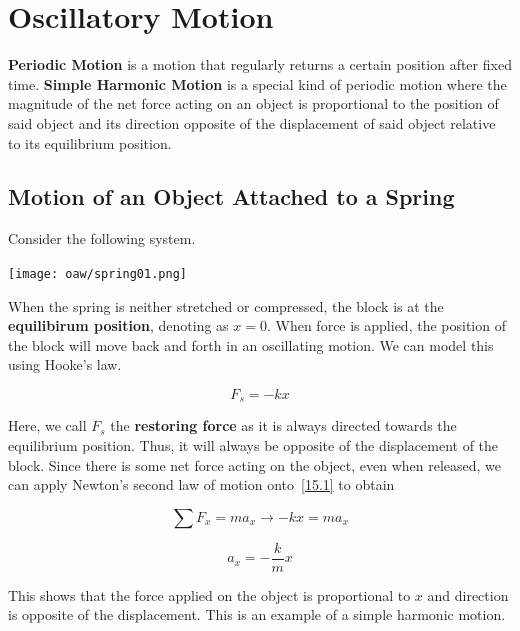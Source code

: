 \chapter{Oscillatory Motion}

\textbf{Periodic Motion} is a motion that regularly returns a certain position after fixed time.
\textbf{Simple Harmonic Motion} is a special kind of periodic motion where the magnitude of the 
net force acting on an object is proportional to the position of said object and its direction
opposite of the displacement of said object relative to its equilibrium position.

\section{Motion of an Object Attached to a Spring}

Consider the following system.

\begin{center}
\texttt{[image: oaw/spring01.png]}\label{fig15.1}
\end{center}

When the spring is neither stretched or compressed, the block is at the \textbf{equilibirum position},
denoting as $x = 0$. When force is applied, the position of the block will move back and forth in an 
oscillating motion. We can model this using Hooke's law.

\begin{equation}\label{15.1}
    F_s = -kx
\end{equation} 

Here, we call $F_s$ the \textbf{restoring force} as it is always directed towards the equilibrium position.
Thus, it will always be opposite of the displacement of the block. Since there is some net force
acting on the object, even when released, we can apply Newton's second law of motion onto~\eqref{15.1}
to obtain

\begin{equation*}
    \sum F_x = ma_x \rightarrow -kx = ma_x
\end{equation*}

\begin{equation}\label{15.2}
    a_x = - \frac{k}{m}x
\end{equation}

This shows that the force applied on the object is proportional to $x$ and direction is opposite 
of the displacement. This is an example of a simple harmonic motion.

